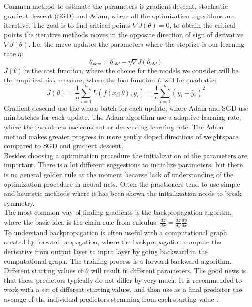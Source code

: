 Commen method to estimate the parameters is gradient descent, stochastic gradient descent (SGD) and Adam, where all the optimization algorithms are iterative. The goal is to find critical points $\nabla J(\theta)=0$, to obtain the critical points the iterative methods moves in the opposite direction of sign of derivative $\nabla J(\theta)$. I.e. the move updates the parameters where the stepsize is our learning rate $\eta$:
$$\theta_{new}=\theta_{old} - \eta \nabla J(\theta_{old}) $$
$J(\theta)$ is the cost function, where the choice for the models we consider will be the empirical risk measure, where the loss function $L$ will be quadratic:
$$J(\theta)= \frac{1}{n}\sum_{i=1}^{n} L(f(x_i;\theta),y_i)=\frac{1}{n}\sum_{i=1}^{n} (y_i-\hat{y}_i)^2$$
Gradient descend use the whole batch for each update, where Adam and SGD use minibatches for each update. The Adam algortihm use a adaptive learning rate, where the two others use constant or descending learning rate. The Adam method makes greater progress in more gently sloped directions of weightspace compared to SGD and gradient descent.\\ 

Besides choosing a optimization procedure the initialization of the parameters are important. There is a lot different suggestions to initialize parameters, but there is no general golden rule at the moment because lack of understanding of the optimization procedure in neural nets. Often the practioners tend to use simple and heuristic methods where it has been shown the initialization needs to break symmetry.\\

The most common way of finding gradients is the backpropagation algoritm, where the basic idea is the chain rule from calculus: $\frac{dz}{dx}= \frac{dz}{dy} \frac{dy}{dx}$\\
To understand backpropagation is often useful with a computational graph created by forward propagation, where the backpropagation compute the derivative from output layer to input layer by going backward in the computational graph. The training process is a forward-backward algorithm. Different starting values of $\theta$ will result in different parameters. The good news is that these predictors typically do not differ by very much. It is recommended to work with a set of different starting values, and then use as a final predictor the average of the individual predictors stemming from each starting value \parencite{Goodfellow-et-al-2016}.



